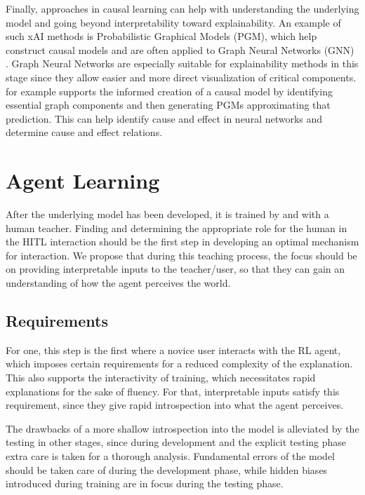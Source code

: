 \documentclass[twoside,11pt]{article}
\begin{document}
Finally, approaches in causal learning can help with understanding the underlying model and going beyond interpretability toward explainability.
An example of such xAI methods is Probabilistic Graphical Models (PGM), which help construct causal models and are often applied to Graph Neural Networks (GNN) \citep{Saranti:2019:LearningCompetencePGMs}. Graph Neural Networks are especially suitable for explainability methods in this stage since they allow easier and more direct visualization of critical components. \citet{Vu:2020:PGMExplainer} for example supports the informed creation of a causal model by identifying essential graph components and then generating PGMs approximating that prediction. This can help identify cause and effect in neural networks and determine cause and effect relations.

\section{Agent Learning}
\label{sec:AgentLearning}

After the underlying model has been developed, it is trained by and with a human teacher.
Finding and determining the appropriate role for the human in the HITL interaction should be the first step in developing an optimal mechanism for interaction. We propose that during this teaching process, the focus should be on providing interpretable inputs to the teacher/user, so that they can gain an understanding of how the agent perceives the world.

\subsection{Requirements}
For one, this step is the first where a novice user interacts with the RL agent, which imposes certain requirements for a reduced complexity of the explanation. This also supports the interactivity of training, which necessitates rapid explanations for the sake of fluency. For that, interpretable inputs satisfy this requirement, since they give rapid introspection into what the agent perceives.

The drawbacks of a more shallow introspection into the model is alleviated by the testing in other stages, since during development and the explicit testing phase extra care is taken for a thorough analysis. Fundamental errors of the model should be taken care of during the development phase, while hidden biases introduced during training are in focus during the testing phase.
\end{document}
